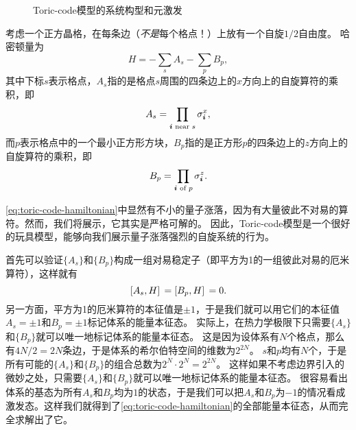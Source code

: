 \begin{figure}
    \centering
    \vfill
    \caption{Toric-code模型的系统构型和元激发}
\end{figure}

考虑一个正方晶格，在每条边（\emph{不是}每个格点！）上放有一个自旋$1/2$自由度。
哈密顿量为
\begin{equation}
    {H} = - \sum_s {A}_s - \sum_p {B}_p,
    \label{eq:toric-code-hamiltonian}
\end{equation}
其中下标$s$表示格点，${A}_s$指的是格点$s$周围的四条边上的$x$方向上的自旋算符的乘积，即
\begin{equation}
    {A}_s = \prod_{\vb*{i} \text{ near } s} {\sigma}_{\vb*{i}}^x,
\end{equation}
而$p$表示格点中的一个最小正方形方块，${B}_p$指的是正方形$p$的四条边上的$z$方向上的自旋算符的乘积，即
\begin{equation}
    {B}_p = \prod_\text{$\vb*{i}$ of $p$} {\sigma}_{\vb*{i}}^z.
\end{equation}

\eqref{eq:toric-code-hamiltonian}中显然有不小的量子涨落，因为有大量彼此不对易的算符。然而，我们将展示，它其实是严格可解的。
因此，Toric-code模型是一个很好的玩具模型，能够向我们展示量子涨落强烈的自旋系统的行为。

首先可以验证$\{{A}_s\}$和$\{{B}_p\}$构成一组对易稳定子（即平方为1的一组彼此对易的厄米算符），这样就有
\begin{equation}
    \comm*{{A}_s}{{H}} = \comm*{{B}_p}{{H}} = 0.
\end{equation}
另一方面，平方为1的厄米算符的本征值是$\pm 1$，于是我们就可以用它们的本征值$A_s = \pm 1$和$B_p = \pm 1$标记体系的能量本征态。
实际上，在热力学极限下只需要$\{A_s\}$和$\{B_p\}$就可以唯一地标记体系的能量本征态。
这是因为设体系有$N$个格点，那么有$4N/2=2N$条边，于是体系的希尔伯特空间的维数为$2^{2N}$。%
$s$和$p$均有$N$个，于是所有可能的$\{A_s\}$和$\{B_p\}$的组合总数为$2^N \cdot 2^N=2^{2N}$。
这样如果不考虑边界引入的微妙之处，只需要$\{A_s\}$和$\{B_p\}$就可以唯一地标记体系的能量本征态。
很容易看出体系的基态为所有$A_s$和$B_p$均为$1$的状态，于是我们可以把$A_s$和$B_p$为$-1$的情况看成激发态。这样我们就得到了\eqref{eq:toric-code-hamiltonian}的全部能量本征态，从而完全求解出了它。

